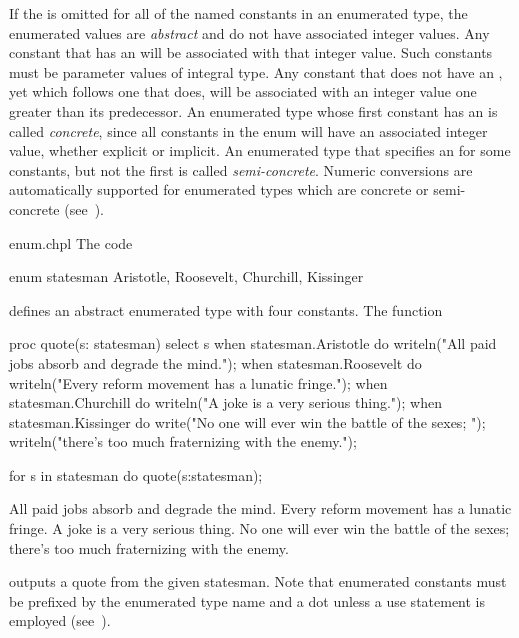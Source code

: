 If the  is omitted for all of the named constants in
an enumerated type, the enumerated values are \emph{abstract} and do
not have associated integer values.  Any constant that has an
 will be associated with that integer value.  Such
constants must be parameter values of integral type.  Any constant
that does not have an , yet which follows one that
does, will be associated with an integer value one greater than its
predecessor.  An enumerated type whose first constant has
an  is called \emph{concrete}, since all constants in
the enum will have an associated integer value, whether explicit or
implicit.  An enumerated type that specifies an  for
some constants, but not the first is called \emph{semi-concrete}.
Numeric conversions are automatically supported for enumerated types
which are concrete or semi-concrete
(see~).

\begin{chapelexample}{enum.chpl}
The code
\begin{chapel}
enum statesman { Aristotle, Roosevelt, Churchill, Kissinger }
\end{chapel}
defines an abstract enumerated type with four constants.  The function
\begin{chapel}
proc quote(s: statesman) {
  select s {
    when statesman.Aristotle do
       writeln("All paid jobs absorb and degrade the mind.");
    when statesman.Roosevelt do
       writeln("Every reform movement has a lunatic fringe.");
    when statesman.Churchill do
       writeln("A joke is a very serious thing.");
    when statesman.Kissinger do
       { write("No one will ever win the battle of the sexes; ");
         writeln("there's too much fraternizing with the enemy."); }
  }
}
\end{chapel}
\begin{chapelnoprint}
for s in statesman do
  quote(s:statesman);
\end{chapelnoprint}
\begin{chapeloutput}
All paid jobs absorb and degrade the mind.
Every reform movement has a lunatic fringe.
A joke is a very serious thing.
No one will ever win the battle of the sexes; there's too much fraternizing with the enemy.
\end{chapeloutput}
outputs a quote from the given statesman.  Note that enumerated
constants must be prefixed by the enumerated type name and a dot unless a
use statement is employed (see~).
\end{chapelexample}

